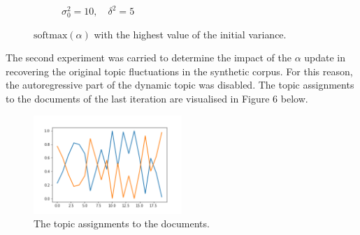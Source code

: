 \documentclass[12pt]{article}
\begin{document}
\begin{figure}[H]
\begin{subfigure}[b]{0.33\textwidth}
                \caption{$\sigma^2_0=10,\quad \delta^2=5$}
                \label{fig:tiger}
        \end{subfigure}
        \caption{$\mbox{softmax}(\alpha)$ with the highest value of the initial variance.}\label{fig:animals}
\end{figure}


\par The second experiment was carried to determine the impact of the $\alpha$ update in recovering the original topic fluctuations in the synthetic corpus. For this reason, the autoregressive part of the dynamic topic was disabled. The topic assignments to the documents of the last iteration are visualised in Figure 6 below.

\begin{figure}[H]
  \centering
  \includegraphics[width=0.5\textwidth]{thetas}
  \caption{The topic assignments to the documents.}
  \label{fig:mu}
\end{figure}





%
\end{document}
